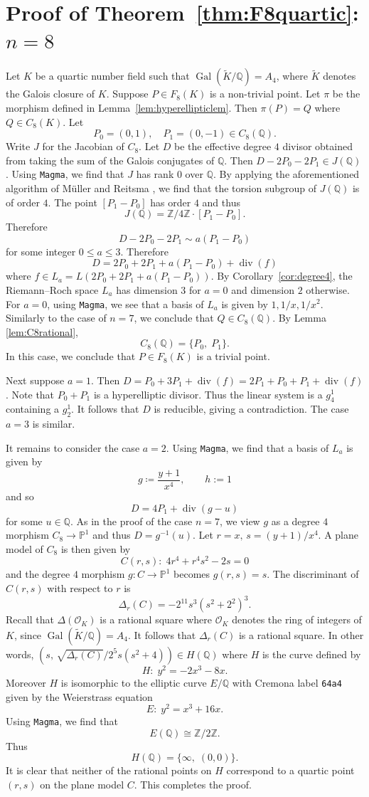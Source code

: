\documentclass{amsart}
\theoremstyle{definition}
\newcommand{\PP}{\mathbb{P}}
\newcommand{\Z}{\mathbb{Z}}
\newcommand{\Q}{\mathbb{Q}}
\DeclareMathOperator{\Gal}{Gal}
\DeclareMathOperator{\divv}{div}
\begin{document}
\section{Proof of Theorem~\ref{thm:F8quartic}: $n=8$}\label{sec:F88}

Let $K$ be a quartic number field such that $\Gal(\tilde{K}/\Q)=A_{4}$, where $\tilde{K}$ denotes the Galois closure of $K$. Suppose $P\in F_{8}(K)$ is a non-trivial point. 
Let $\pi$ be the morphism defined in Lemma~\ref{lem:hyperellipticlem}. 
Then $\pi(P)=Q$ where $Q\in C_8(K)$.
Let 
\[
P_0=(0,1),\quad P_1=(0,-1)\in C_8(\Q).
\]
Write $J$ for the Jacobian of $C_8$. Let $D$ be the effective degree $4$ divisor obtained from taking the sum of the Galois conjugates of $\Q$. 
Then $D-2P_0-2P_1\in J(\Q)$. 
Using \texttt{Magma}, we find that $J$ has rank $0$ over $\Q$. By applying the aforementioned algorithm of M\"{u}ller and Reitsma \cite{Muller}, we find that the torsion subgroup of $J(\Q)$ is of order $4$. 
The point $[P_1-P_0]$ has order $4$ and thus
\[
J(\Q)=\Z/4\Z\cdot [P_1-P_0].
\]
Therefore
\[
D-2P_0-2P_1\sim a(P_1-P_0)
\]
for some integer $0\leq a\leq 3$.
Therefore 
\[
D = 2P_0+2P_1 + a(P_1-P_0) + \divv(f)
\]
where $f\in L_a=L(2P_0+2P_1 + a(P_1-P_0))$. 
By Corollary~\ref{cor:degree4}, the Riemann--Roch space $L_a$ has dimension $3$ for $a=0$ and dimension $2$ otherwise. For $a=0$, using \texttt{Magma}, we see that a basis of $L_a$ is given by $1, 1/x, 1/x^2$. Similarly to the case of $n=7$, we conclude that $Q\in C_8(\Q)$. 
By Lemma \ref{lem:C8rational},
\[
C_8(\Q)=\{P_0, \;P_1\}.
\]
In this case, we conclude that $P\in F_8(K)$ is a trivial point.

Next suppose $a=1$. Then $D=P_0+3P_1+\divv(f)=2P_1+P_0+P_1+\divv(f)$. Note that $P_0+P_1$
is a hyperelliptic divisor. Thus the linear system is a $g_4^1$ containing a $g_2^1$.
It follows that $D$ is reducible, giving a contradiction. The case $a=3$ is similar.

It remains to consider the case $a=2$. 
Using \texttt{Magma}, we find that a basis of $L_a$ 
is given by 
\[
g\coloneqq \frac{y+1}{x^4},\qquad h:=1 
\]
and so
\[
D = 4P_1 + \divv(g-u)
\]
for some $u\in \Q$. 
As in the proof of the case $n=7$, we view $g$ as a degree $4$ morphism $C_8\rightarrow \PP^1$ and thus $D=g^{-1}(u)$.  
Let $r=x, \,s=(y+1)/x^4$. 
A plane model of $C_8$ is then given by 
\[
C(r,s): \; 4r^4 + r^4s^2 - 2s = 0
\]
and the degree $4$ morphism $g:C\rightarrow \PP^1$ becomes $g(r,s) = s$.
The discriminant of $C(r,s)$ with respect to $r$ is
\[
\Delta_r(C)=-2^{11}s^{3}(s^2+2^2)^3.
\]
Recall that $\Delta(\mathcal{O}_K)$ is a rational square where $\mathcal{O}_{K}$ denotes the ring of integers of $K$, since $\Gal(\tilde{K}/\Q)=A_{4}$.
It follows that $\Delta_r(C)$ is a rational square. 
In other words, $(s,\, \sqrt{\Delta_r(C)}/2^{5}s(s^2+4))\in H(\Q)$ where $H$ is the curve defined by
\[
H:\; y^2=-2x^3-8x.
\]
Moreover $H$ is isomorphic to the elliptic 
curve $E/\Q$ with Cremona label \texttt{64a4} given by the Weierstrass equation
\[
E:\; y^2 = x^3 + 16x.
\]
Using \texttt{Magma}, we find that 
\[
E(\Q) \cong\Z/2\Z.
\]
Thus
\[
H(\Q)=\{\infty, \;(0,0)\}.
\]
It is clear that neither of the rational points on $H$ correspond to a quartic point $(r,s)$ on the plane model $C$. This completes the proof.
\end{document}
